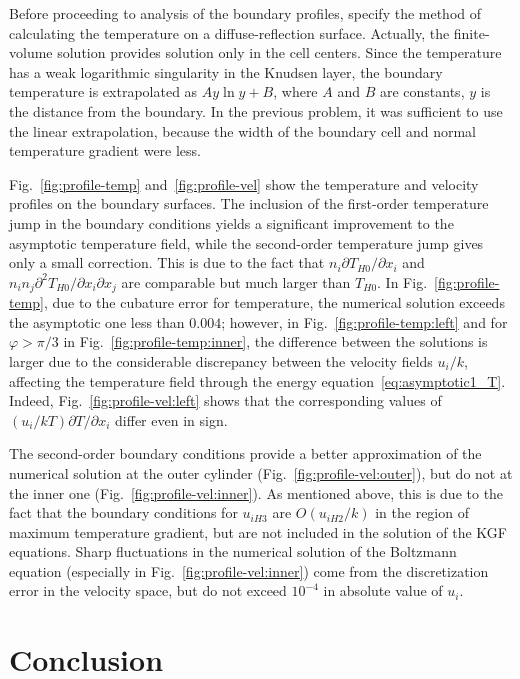 \documentclass[10pt]{article}
\newcommand{\Pder}[2][]{\partial#1/\partial#2}
\newcommand{\Pderder}[3][]{\partial^2#1/\partial#2\partial#3}
\newcommand{\OO}[1]{O(#1)}
\begin{document}
Before proceeding to analysis of the boundary profiles,
specify the method of calculating the temperature on a diffuse-reflection surface.
Actually, the finite-volume solution provides solution only in the cell centers.
Since the temperature has a weak logarithmic singularity in the Knudsen layer,
the boundary temperature is extrapolated as \(Ay\ln{y}+B\),
where \(A\) and \(B\) are constants, \(y\) is the distance from the boundary.
In the previous problem, it was sufficient to use the linear extrapolation,
because the width of the boundary cell and normal temperature gradient were less.

Fig.~\ref{fig:profile-temp} and~\ref{fig:profile-vel} show the temperature and velocity profiles on the boundary surfaces.
The inclusion of the first-order temperature jump in the boundary conditions
yields a significant improvement to the asymptotic temperature field,
while the second-order temperature jump gives only a small correction.
This is due to the fact that \(n_i\Pder[T_{H0}]{x_i}\) and \(n_in_j\Pderder[T_{H0}]{x_i}{x_j}\)
are comparable but much larger than \(T_{H0}\).
In Fig.~\ref{fig:profile-temp}, due to the cubature error for temperature,
the numerical solution exceeds the asymptotic one less than \(0.004\);
however, in Fig.~\ref{fig:profile-temp:left} and for \(\varphi>\pi/3\) in Fig.~\ref{fig:profile-temp:inner},
the difference between the solutions is larger due to the considerable discrepancy between the velocity fields \(u_i/k\),
affecting the temperature field through the energy equation~\eqref{eq:asymptotic1_T}.
Indeed, Fig.~\ref{fig:profile-vel:left} shows that the corresponding values of \((u_i/kT)\Pder[T]{x_i}\) differ even in sign.

The second-order boundary conditions provide a better approximation of the numerical solution
at the outer cylinder (Fig.~\ref{fig:profile-vel:outer}), but do not at the inner one (Fig.~\ref{fig:profile-vel:inner}).
As mentioned above, this is due to the fact that the boundary conditions for \(u_{iH3}\) are \(\OO{u_{iH2}/k}\)
in the region of maximum temperature gradient, but are not included in the solution of the KGF equations.
Sharp fluctuations in the numerical solution of the Boltzmann equation (especially in Fig.~\ref{fig:profile-vel:inner})
come from the discretization error in the velocity space, but do not exceed \(10^{-4}\) in absolute value of \(u_i\).

\section{Conclusion}
\end{document}
